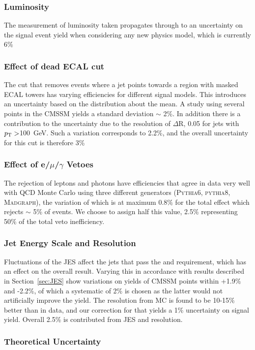 \subsubsection{Luminosity}
The measurement of luminosity taken propagates through to an uncertainty on the signal event yield when considering any new physics model, which is currently 6\%~\cite{EWK-11-001}
\subsubsection{Effect of dead ECAL cut}
The cut that removes events where a jet points towards a region with masked ECAL towers has varying efficiencies for different signal models. This introduces an uncertainty based on the distribution about the mean. A study using several points in the CMSSM yields a standard deviation $\sim$ 2\%. In addition there is a contribution to the uncertainty due to the resolution of $\Delta$R, 0.05 for jets with ${p_{\text T}} >$100~GeV. Such a variation corresponds to 2.2\%, and the overall uncertainty for this cut is therefore 3\%
\subsubsection{Effect of e/$\mu$/$\gamma$ Vetoes}
The rejection of leptons and photons have efficiencies that agree in data very well with QCD Monte Carlo using three different generators (\textsc{Pythia6, pythia8, Madgraph}), the variation of which is at maximum 0.8\% for the total effect which rejects $\sim$ 5\% of events. We choose to assign half this value, 2.5\% representing 50\% of the total veto inefficiency.

\subsubsection{Jet Energy Scale and Resolution}
Fluctuations of the JES affect the jets that pass the \Pt and \HT requirement, which has an effect on the overall result. Varying this in accordance with results described in Section~\ref{sec:JES} show variations on yields of CMSSM points within +1.9\% and -2.2\%, of which a systematic of 2\% is chosen as the latter would not artificially improve the yield. The resolution from MC is found to be 10-15\% better than in data, and our correction for that yields a 1\% uncertainty on signal yield. Overall 2.5\% is contributed from JES and resolution.

\subsubsection{Theoretical Uncertainty}

